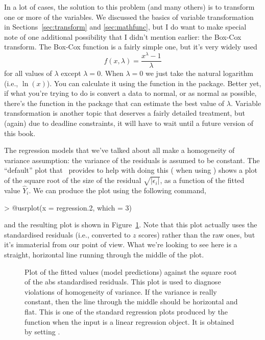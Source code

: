 In a lot of cases, the solution to this problem (and many others) is to transform one or more of the variables. We discussed the basics of variable transformation in Sections~\ref{sec:transform} and \ref{sec:mathfunc}, but I do want to make special note of one additional possibility that I didn't mention earlier: the Box-Cox transform. The Box-Cox function is a fairly simple one, but it's very widely used 
$$
f(x,\lambda) = \frac{x^\lambda - 1}{\lambda}
$$
for all values of $\lambda$ except $\lambda = 0$. When $\lambda = 0$ we just take the natural logarithm (i.e., $\ln(x)$). You can calculate it using the  function in the  package. Better yet, if what you're trying to do is convert a data to normal, or as normal as possible, there's the  function in the  package that can estimate the best value of $\lambda$. Variable transformation is another topic that deserves a fairly detailed treatment, but (again) due to deadline constraints, it will have to wait until a future version of this book. 





The regression models that we've talked about all make a homogeneity of variance assumption: the variance of the residuals is assumed to be constant. The ``default'' plot that \R\ provides to help with doing this ( when using ) shows a plot of the square root of the size of the residual $\sqrt{|\epsilon_i|}$, as a function of the fitted value $\hat{Y}_i$. We can produce the plot using the following command,
\begin{rblock1}
> @usr{plot(x = regression.2, which = 3)}
\end{rblock1}
and the resulting plot is shown in Figure~\ref{fig:regressionplot3}. Note that this plot actually uses the standardised residuals (i.e., converted to $z$ scores) rather than the raw ones, but it's immaterial from our point of view. What we're looking to see here is a straight, horizontal line running through the middle of the plot.

\begin{figure}[t]
\begin{center}
\caption{Plot of the fitted values (model predictions) against the square root of the abs standardised residuals. This plot is used to diagnose violations of homogeneity of variance. If the variance is really constant, then the line through the middle should be horizontal and flat. This is one of the standard regression plots produced by the  function when the input is a linear regression object. It is obtained by setting .}
\HR
\label{fig:regressionplot3}
\end{center}
\end{figure}


